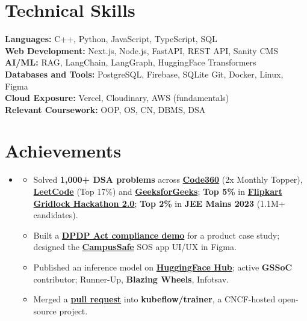 \documentclass[letterpaper,11pt]{article}
\newcommand{\resumeItem}[1]{
  \item\small{
    {#1 \vspace{-2pt}} %
  }
}
\newcommand{\resumeSubHeadingListStart}{\begin{itemize}[leftmargin=0.0in, label={}]}
\newcommand{\resumeSubHeadingListEnd}{\end{itemize}}
\newcommand{\resumeItemListStart}{\begin{itemize}}
\newcommand{\resumeItemListEnd}{\end{itemize}\vspace{-5pt}}
\begin{document}
\section{Technical Skills}
 \begin{itemize}[leftmargin=0.15in, label={}]
    \small{\item{
     \textbf{Languages: }{C++, Python, JavaScript, TypeScript, SQL} \\
     \textbf{Web Development: }{Next.js, Node.js, FastAPI, REST API, Sanity CMS} \\
     \textbf{AI/ML: }{RAG, LangChain, LangGraph, HuggingFace Transformers} \\
     \textbf{Databases and Tools: }{PostgreSQL, Firebase, SQLite Git, Docker, Linux, Figma} \\
     \textbf{Cloud Exposure: }{Vercel, Cloudinary, AWS (fundamentals)} \\
     \textbf{Relevant Coursework: }{OOP, OS, CN, DBMS, DSA} \\
    }}
 \end{itemize}

\section{Achievements}
    \resumeSubHeadingListStart
        \item[]
        \resumeItemListStart
            \resumeItem{Solved {\textbf{1,000+ DSA problems}} across {\href{https://www.naukri.com/code360/profile/1d0eab26-a66e-4d90-99ed-46328d444eab}{\textbf{Code360}}} (2x Monthly Topper), {\href{https://leetcode.com/u/abhiii1005_/}{\textbf{LeetCode}}} (Top 17\%) and {\href{https://www.geeksforgeeks.org/profile/abhi_iiitm}{\textbf{GeeksforGeeks}}}; {\textbf{Top 5\%}} in {\href{https://gridlock2point0.hackerearth.com/}{\textbf{Flipkart Gridlock Hackathon 2.0}}}; {\textbf{Top 2\%}} in {\textbf{JEE Mains 2023}} (1.1M+ candidates).}
            \resumeItem{Built a {\href{https://verifiable-parent-consent.netlify.app/}{\textbf{DPDP Act compliance demo}}} for a product case study; designed the {\href{https://www.figma.com/proto/uxLpOhTw26VaPZOCj8IUlK/CampusSafe?node-id=0-1&t=M8kEMZIFKWhZlpuK-1}{\textbf{CampusSafe}}} SOS app UI/UX in Figma.}
            \resumeItem{Published an inference model on {\href{https://huggingface.co/abhishek1005}{\textbf{HuggingFace Hub}}}; active {\textbf{GSSoC}} contributor; Runner-Up, {\textbf{Blazing Wheels}}, Infotsav.}
            \resumeItem{Merged a {\href{https://github.com/kubeflow/trainer/pull/3960}{\textbf{pull request}}} into {\textbf{kubeflow/trainer}}, a CNCF-hosted open-source project.}
        \resumeItemListEnd
    \resumeSubHeadingListEnd
\end{document}
